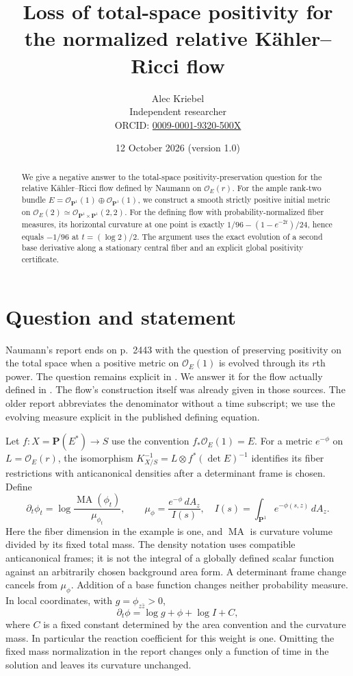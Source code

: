\documentclass[11pt]{article}
\title{Loss of total-space positivity for the normalized relative K\"ahler--Ricci flow}
\author{Alec Kriebel\\\small Independent researcher\\
\small ORCID: \href{https://orcid.org/0009-0001-9320-500X}{0009-0001-9320-500X}}
\date{12 October 2026 \quad (version 1.0)}
\newcommand{\PP}{\mathbf P}
\newcommand{\OO}{\mathcal O}
\newcommand{\MA}{\operatorname{MA}}
\begin{document}
\maketitle
\begin{abstract}
We give a negative answer to the total-space positivity-preservation question
for the relative K\"ahler--Ricci flow defined by Naumann on $\OO_E(r)$.
For the ample rank-two bundle $E=\OO_{\PP^1}(1)\oplus\OO_{\PP^1}(1)$,
we construct a smooth strictly positive initial metric on
$\OO_E(2)\simeq\OO_{\PP^1\times\PP^1}(2,2)$.
For the defining flow with probability-normalized fiber measures, its horizontal
curvature at one point is exactly
$1/96-(1-e^{-2t})/24$, hence equals $-1/96$ at $t=(\log2)/2$.
The argument uses the exact evolution of a second base derivative along a
stationary central fiber and an explicit global positivity certificate.
\end{abstract}

\section{Question and statement}
Naumann's report \cite{O} ends on p.~2443 with the question of preserving
positivity on the total space when a positive metric on $\OO_E(1)$ is evolved
through its $r$th power. The question remains explicit in \cite[\S3.3]{N}.
We answer it for the flow actually defined in \cite[(13)]{N}.
The flow's construction itself was already given in those sources.
The older report abbreviates the denominator without a time subscript;
we use the evolving measure explicit in the published defining equation.

Let $f:X=\PP(E^*)\to S$ use the convention $f_*\OO_E(1)=E$.
For a metric $e^{-\phi}$ on $L=\OO_E(r)$, the isomorphism
$K_{X/S}^{-1}=L\otimes f^*(\det E)^{-1}$ identifies its fiber restrictions
with anticanonical densities after a determinant frame is chosen. Define
\begin{equation}\label{flow}
 \partial_t\phi_t=\log\frac{\MA(\phi_t)}{\mu_{\phi_t}},\qquad
 \mu_\phi=\frac{e^{-\phi}\,dA_z}{I(s)},\quad
 I(s)=\int_{\PP^1}e^{-\phi(s,z)}\,dA_z.
\end{equation}
Here the fiber dimension in the example is one, and $\MA$ is curvature volume
divided by its fixed total mass. The density notation uses compatible
anticanonical frames; it is not the integral of a globally defined scalar
function against an arbitrarily chosen background area form. A determinant
frame change cancels from $\mu_\phi$. Addition of a base function changes
neither probability measure. In local coordinates, with $g=\phi_{z\bar z}>0$,
\begin{equation}\label{scalar}
 \partial_t\phi=\log g+\phi+\log I+C,
\end{equation}
where $C$ is a fixed constant determined by the area convention and the
curvature mass. In particular the reaction coefficient for this weight is one.
Omitting the fixed mass normalization in the report changes only a function
of time in the solution and leaves its curvature unchanged.
\end{document}
